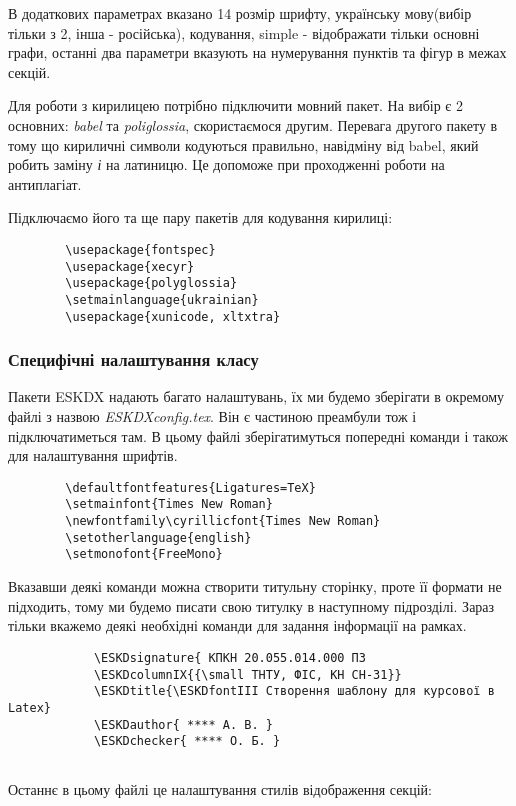 В додаткових параметрах вказано 14 розмір шрифту, українську мову(вибір тільки з 2, інша - російська), кодування, simple - відображати тільки основні графи, останні два параметри вказують на нумерування пунктів та фігур в межах секцій.

Для роботи з кирилицею потрібно підключити мовний пакет. На вибір є 2 основних: \textit{babel} та \textit{poliglossia}, скористаємося другим. Перевага другого пакету в тому що кириличні символи кодуються правильно, навідміну від babel, який робить заміну \textit{і} на латиницю. Це допоможе при проходженні роботи на антиплагіат.

Підключаємо його та ще пару пакетів для кодування кирилиці:

\begin{lstlisting}
		\usepackage{fontspec}
		\usepackage{xecyr}
		\usepackage{polyglossia}
		\setmainlanguage{ukrainian}
		\usepackage{xunicode, xltxtra}
\end{lstlisting}


\subsubsection{Специфічні налаштування класу}


Пакети ESKDX надають багато налаштувань, їх ми будемо зберігати в окремому файлі з назвою \textit{ESKDXconfig.tex}. Він є частиною преамбули тож і підключатиметься там. В цьому файлі зберігатимуться попередні команди і також для налаштування шрифтів.

\begin{lstlisting}
		\defaultfontfeatures{Ligatures=TeX}
		\setmainfont{Times New Roman} 
		\newfontfamily\cyrillicfont{Times New Roman}
		\setotherlanguage{english}
		\setmonofont{FreeMono}
\end{lstlisting}

Вказавши деякі команди можна створити титульну сторінку, проте її формати не підходить, тому ми будемо писати свою титулку в наступному підрозділі. Зараз тільки вкажемо деякі необхідні команди для задання інформації на рамках.
\begin{lstlisting}
			\ESKDsignature{ КПКН 20.055.014.000 ПЗ
			\ESKDcolumnIX{{\small ТНТУ, ФІС, КН СН-31}}
			\ESKDtitle{\ESKDfontIII Створення шаблону для курсової в Latex}
			\ESKDauthor{ **** А. В. }
			\ESKDchecker{ **** О. Б. }
			
\end{lstlisting}

Останнє в цьому файлі це налаштування стилів відображення секцій:

